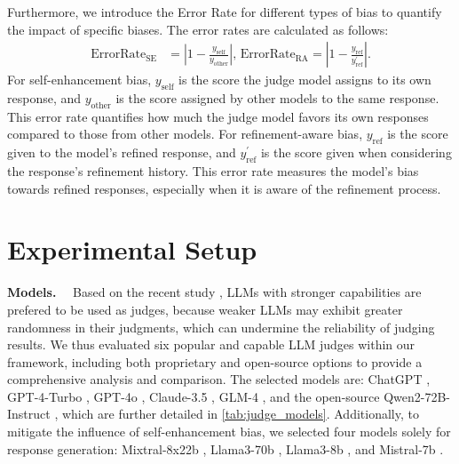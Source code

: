 \documentclass{article} %
\newcommand{\header}[1]{\noindent\textbf{{#1}}~~}
\begin{document}
Furthermore, we introduce the Error Rate for different types of bias to quantify the impact of specific biases. The error rates are calculated as follows:
    \begin{align*}
\text{ErrorRate}_{\text{SE}} &= \left|1 - \frac{y_{\text{self}}}{y_{\text{other}}}\right|,\,
\text{ErrorRate}_{\text{RA}} = \left|1 - \frac{y_{\text{ref}}}{y^{'}_{\text{ref}}}\right|.
\end{align*}
For self-enhancement bias, \(y_{\text{self}}\) is the score the judge model assigns to its own response, and \(y_{\text{other}}\) is the score assigned by other models to the same response. This error rate quantifies how much the judge model favors its own responses compared to those from other models. For refinement-aware bias, \(y_{\text{ref}}\) is the score given to the model’s refined response, and \(y^{'}_{\text{ref}}\) is the score given when considering the response’s refinement history. This error rate measures the model’s bias towards refined responses, especially when it is aware of the refinement process.





\section{Experimental Setup}
\vspace{-1em}
\header{Models.}
Based on the recent study
\citep{gao2024best, liu2023alignbenchbenchmarkingchinesealignment, li2024quantifyingaipsychologypsychometrics}, LLMs with stronger capabilities are prefered to be used as judges, because weaker 
LLMs may exhibit greater randomness in their judgments, which can undermine the reliability of judging results. %
We thus evaluated six popular and capable LLM judges within our framework, including both proprietary and open-source options to provide a comprehensive analysis and comparison. The selected models are: ChatGPT \citep{openai_gpt35_turbo}, GPT-4-Turbo \citep{openai2024gpt4report}, GPT-4o \citep{openai_hello_gpt4o}, Claude-3.5 \citep{anthropic_claude35}, GLM-4 \citep{glm2024chatglm}, and the open-source Qwen2-72B-Instruct \citep{qwen}, which are further detailed in \autoref{tab:judge_models}. Additionally, to mitigate the influence of self-enhancement bias, we selected four models solely for response generation: Mixtral-8x22b \citep{mistral2024mixtral}, Llama3-70b \citep{llama3modelcard}, Llama3-8b \citep{llama3modelcard}, and Mistral-7b \citep{mistral2023mistral7b}.
\end{document}
